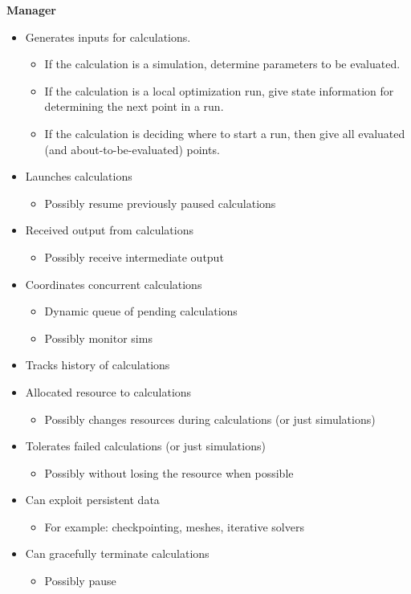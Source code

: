 \documentclass{article}
\begin{document}
\noindent \textbf{Manager}
\begin{itemize}
  \item Generates inputs for calculations.
    \begin{itemize}
      \item If the calculation is a simulation, determine parameters to be
        evaluated.
      \item If the calculation is a local optimization run, give state
        information for determining the next point in a run. 
      \item If the calculation is deciding where to start a run, then give all
        evaluated (and about-to-be-evaluated) points.
    \end{itemize}
  \item Launches calculations
    \begin{itemize}
      \item Possibly resume previously paused calculations
    \end{itemize}
  \item Received output from calculations
    \begin{itemize}
      \item Possibly receive intermediate output
    \end{itemize}
  \item Coordinates concurrent calculations 
    \begin{itemize}
      \item Dynamic queue of pending calculations
      \item Possibly monitor sims
    \end{itemize}
  \item Tracks history of calculations
  \item Allocated resource to calculations 
    \begin{itemize}
      \item Possibly changes resources during calculations (or just simulations)
    \end{itemize}
  \item Tolerates failed calculations (or just simulations)
    \begin{itemize}
      \item Possibly without losing the resource when possible
    \end{itemize}
  \item Can exploit persistent data
    \begin{itemize}
      \item For example: checkpointing, meshes, iterative solvers
    \end{itemize}
  \item Can gracefully terminate calculations
    \begin{itemize}
      \item Possibly pause
    \end{itemize}
\end{itemize}
\end{document}
